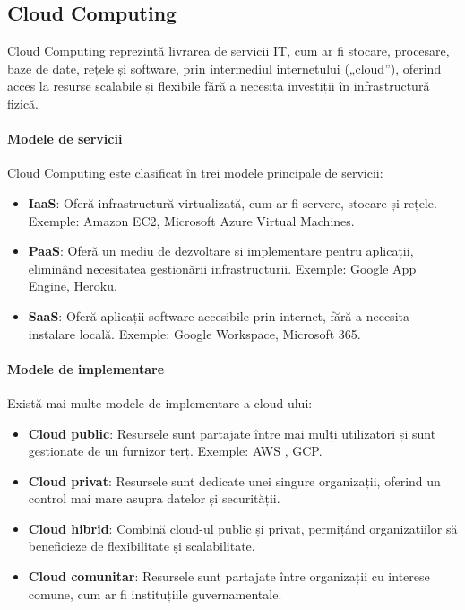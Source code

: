 \documentclass[titlepage,12pt]{article}
\begin{document}
\subsection{Cloud Computing}

Cloud Computing reprezintă livrarea de servicii IT, cum ar fi stocare, procesare, baze de date, rețele și software, prin intermediul internetului („cloud”), oferind acces la resurse scalabile și flexibile fără a necesita investiții în infrastructură fizică.

\paragraph{Modele de servicii}
Cloud Computing este clasificat în trei modele principale de servicii:
\begin{itemize}
\item \textbf{\ac {IaaS}}: Oferă infrastructură virtualizată, cum ar fi servere, stocare și rețele. Exemple: Amazon EC2, Microsoft Azure Virtual Machines.
\item \textbf{\ac {PaaS}}: Oferă un mediu de dezvoltare și implementare pentru aplicații, eliminând necesitatea gestionării infrastructurii. Exemple: Google App Engine, Heroku.
\item \textbf{\ac {SaaS}}: Oferă aplicații software accesibile prin internet, fără a necesita instalare locală. Exemple: Google Workspace, Microsoft 365.
\end{itemize}

\paragraph{Modele de implementare}
Există mai multe modele de implementare a cloud-ului:
\begin{itemize}
\item \textbf{Cloud public}: Resursele sunt partajate între mai mulți utilizatori și sunt gestionate de un furnizor terț. Exemple: \ac {AWS} , \ac {GCP}.
\item \textbf{Cloud privat}: Resursele sunt dedicate unei singure organizații, oferind un control mai mare asupra datelor și securității.
\item \textbf{Cloud hibrid}: Combină cloud-ul public și privat, permițând organizațiilor să beneficieze de flexibilitate și scalabilitate.
\item \textbf{Cloud comunitar}: Resursele sunt partajate între organizații cu interese comune, cum ar fi instituțiile guvernamentale.
\end{itemize}
\end{document}
